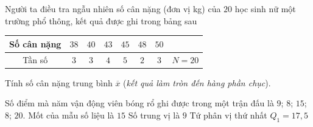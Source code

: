 \begin{bt}%
	Người ta điều tra ngẫu nhiên số cân nặng (đơn vị kg) của $20$ học sinh nữ một trường phổ thông, kết quả được ghi trong bảng sau
	\begin{center}
		\begin{tabular}{|c|c|c|c|c|c|c|c|}
			\hline Số cân nặng & $38$ & $40$ & $43$ & $45$ & $48$ & $50$ & \\
			\hline Tần số & $3$ & $3$ & $4$ & $5$ & $2$ & $3$ & $N=20$ \\
			\hline
		\end{tabular}
	\end{center}
	Tính số cân nặng trung bình $\overline{x}$ (\textit{kết quả làm tròn đến hàng phần chục}).
\end{bt}

\begin{ex}%
Số điểm mà năm vận động viên bóng rổ ghi được trong một trận đấu là $9$; $8$; $15$; $8$; $20$. 
{Mốt của mẫu số liệu là $15$}
{\True Số trung vị là $9$}
{Tứ phân vị thứ nhất $Q_1=17{,}5$}
\end{ex}

